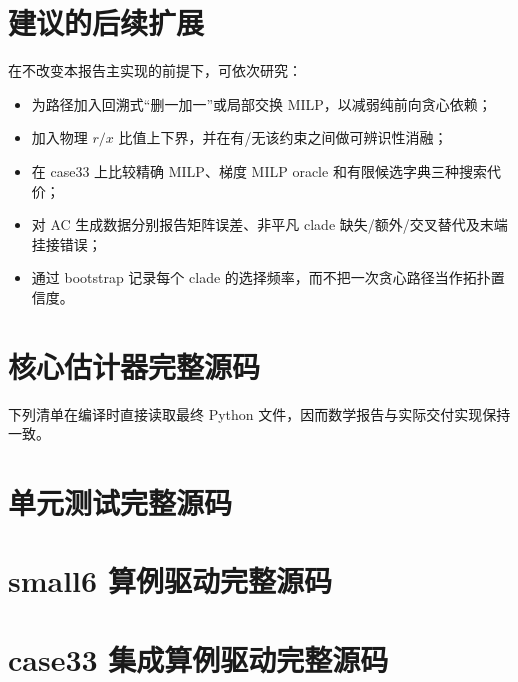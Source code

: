 \documentclass[UTF8,11pt]{ctexart}
\begin{document}
\section{建议的后续扩展}

在不改变本报告主实现的前提下，可依次研究：
\begin{itemize}
  \item 为路径加入回溯式“删一加一”或局部交换 MILP，以减弱纯前向贪心依赖；
  \item 加入物理 $r/x$ 比值上下界，并在有/无该约束之间做可辨识性消融；
  \item 在 case33 上比较精确 MILP、梯度 MILP oracle 和有限候选字典三种搜索代价；
  \item 对 AC 生成数据分别报告矩阵误差、非平凡 clade 缺失/额外/交叉替代及末端挂接错误；
  \item 通过 bootstrap 记录每个 clade 的选择频率，而不把一次贪心路径当作拓扑置信度。
\end{itemize}

\clearpage
\appendix

\section{核心估计器完整源码}

下列清单在编译时直接读取最终 Python 文件，因而数学报告与实际交付实现保持一致。


\clearpage
\section{单元测试完整源码}



\clearpage
\section{small6 算例驱动完整源码}



\clearpage
\section{case33 集成算例驱动完整源码}
\end{document}
